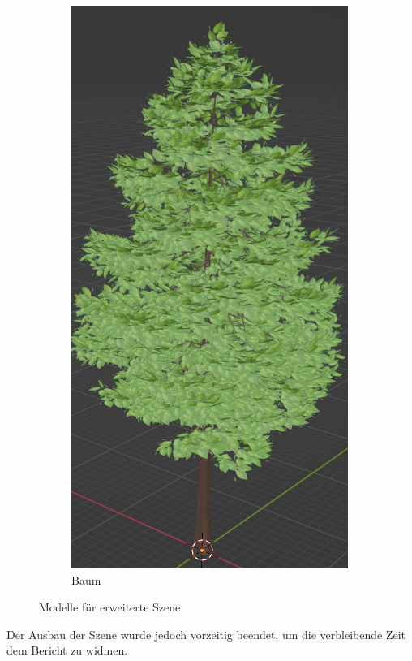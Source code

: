 \begin{figure}[H]
\begin{subfigure}{0.5\textwidth}
		\centering
		\includegraphics[height=0.3\pageheight,keepaspectratio]{pics/16}
		\caption{Baum}
	\end{subfigure}
	\caption{Modelle für erweiterte Szene}
\end{figure}
Der Ausbau der Szene wurde jedoch vorzeitig beendet, um die verbleibende Zeit dem Bericht zu widmen.